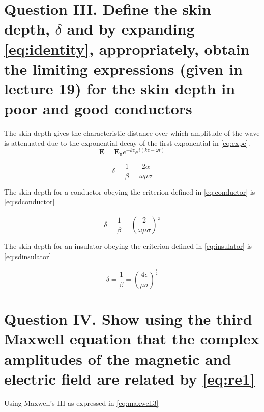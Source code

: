 \documentclass[12pt]{article}
\begin{document}
\section*{Question III.  Define the skin depth, $\delta$ and by expanding \cref{eq:identity}, appropriately, obtain the limiting expressions (given in lecture 19) for the skin depth in poor and good conductors}



\noindent
The skin depth gives the characteristic distance over which amplitude of the wave is attenuated due to the exponential decay of the first exponential in \cref{eq:expe}.
\begin{equation}
\label{eq:expe}
\mathbf{E}=\mathbf{E_{0}}e^{-kz}e^{i(kz-\omega t)}
\end{equation}

\begin{equation}
\label{eq:skindepth}
\delta=\frac{1}{\beta}=\frac{2\alpha}{\omega\mu\sigma}
\end{equation}


The skin depth for a conductor obeying the criterion defined in \cref{eq:conductor} is \cref{eq:sdconductor}


\begin{equation}
\label{eq:sdconductor}
\delta=\frac{1}{\beta}=\left(\frac{2}{\omega\mu\sigma}\right)^{\frac{1}{2}}
\end{equation}

The skin depth for an insulator obeying the criterion defined in \cref{eq:insulator} is \cref{eq:sdinsulator}

\begin{equation}
\label{eq:sdinsulator}
\delta=\frac{1}{\beta}=\left(\frac{4\epsilon}{\mu\sigma}\right)^{\frac{1}{2}}
\end{equation}
\section*{Question IV. Show using the third Maxwell equation that the complex amplitudes of the magnetic and electric field are related by \cref{eq:re1}}

\noindent
Using Maxwell's III as expressed in \cref{eq:maxwell3}
\end{document}
